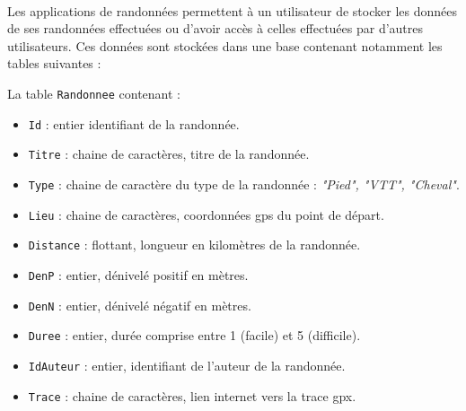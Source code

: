 \documentclass[11pt,a4paper]{article}
\begin{document}
\begin{Exercise}[title = {Gestions de randonnées},origin = {\bac\; {\sc ccinp pc 2025}}]\\
	Les applications de randonnées permettent à un utilisateur de stocker les données de ses randonnées effectuées ou d'avoir accès à celles effectuées par d'autres utilisateurs. Ces données sont stockées dans une base contenant notamment les tables suivantes :

	La table {\tt Randonnee} contenant :
	\begin{itemize}
	\item {\tt Id} : entier identifiant de la randonnée.
	\item {\tt Titre} : chaine de caractères, titre de la randonnée.
	\item {\tt Type} : chaine de caractère du type de la randonnée : \textit{"Pied", "VTT", "Cheval"}.
	\item {\tt Lieu} : chaine de caractères, coordonnées {\sc gps} du point de départ.
	\item {\tt Distance} : flottant, longueur en kilomètres de la randonnée.
	\item {\tt DenP} : entier, dénivelé positif en mètres.
	\item {\tt DenN} : entier, dénivelé négatif en mètres.
	\item {\tt Duree} : entier, durée comprise entre 1 (facile) et 5 (difficile).
	\item {\tt IdAuteur} : entier, identifiant de l'auteur de la randonnée.
	\item {\tt Trace} : chaine de caractères, lien internet vers la trace {\sc gpx}. 
	\end{itemize}


\end{Exercise}
\end{document}

